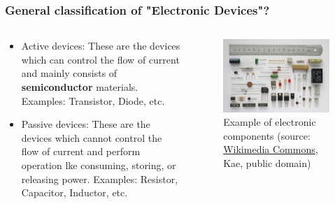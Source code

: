 \begin{frame}
	\frametitle{General classification of "Electronic Devices"?}
	\begin{columns}
		\begin{column}{0.5\textwidth}

			\begin{itemize}
				\item<2-> Active devices: These are the devices which can control the flow of current and mainly consists of \textbf{semiconductor} materials. Examples: Transistor, Diode, etc.
				\item<3-> Passive devices: These are the devices which cannot control the flow of current and perform operation lke consuming, storing, or releasing power. Examples: Resistor, Capacitor, Inductor, etc.
			\end{itemize}
		\end{column}
		\begin{column}{0.5\textwidth}
			\begin{figure}
				\centering
				\includegraphics[scale= 0.05]{fig/lec01/Componentes.jpg}
				\caption{Example of electronic components (source: \href{https://commons.wikimedia.org/wiki/File:Componentes.JPG}{Wikimedia Commons}, Kae, public domain)}
			\end{figure}
		\end{column}
		\end{columns}
\end{frame}

